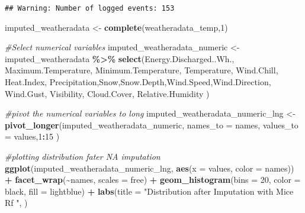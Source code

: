 \documentclass[
]{article}
\newenvironment{Shaded}{\begin{snugshade}}{\end{snugshade}}
\newcommand{\AttributeTok}[1]{\textcolor[rgb]{0.13,0.29,0.53}{#1}}
\newcommand{\CommentTok}[1]{\textcolor[rgb]{0.56,0.35,0.01}{\textit{#1}}}
\newcommand{\DecValTok}[1]{\textcolor[rgb]{0.00,0.00,0.81}{#1}}
\newcommand{\FunctionTok}[1]{\textcolor[rgb]{0.13,0.29,0.53}{\textbf{#1}}}
\newcommand{\NormalTok}[1]{#1}
\newcommand{\OtherTok}[1]{\textcolor[rgb]{0.56,0.35,0.01}{#1}}
\newcommand{\SpecialCharTok}[1]{\textcolor[rgb]{0.81,0.36,0.00}{\textbf{#1}}}
\newcommand{\StringTok}[1]{\textcolor[rgb]{0.31,0.60,0.02}{#1}}
\begin{document}
\begin{verbatim}
## Warning: Number of logged events: 153
\end{verbatim}

\begin{Shaded}
\begin{Highlighting}[]
\NormalTok{imputed\_weatheradata }\OtherTok{\textless{}{-}} \FunctionTok{complete}\NormalTok{(weatheradata\_temp,}\DecValTok{1}\NormalTok{)}

\CommentTok{\#Select numerical variables }
\NormalTok{imputed\_weatheradata\_numeric }\OtherTok{\textless{}{-}}\NormalTok{ imputed\_weatheradata }\SpecialCharTok{\%\textgreater{}\%}
  \FunctionTok{select}\NormalTok{(Energy.Discharged..Wh., Maximum.Temperature, }
\NormalTok{         Minimum.Temperature, Temperature, Wind.Chill, }
\NormalTok{          Heat.Index, Precipitation,Snow,Snow.Depth,Wind.Speed,Wind.Direction, }
\NormalTok{          Wind.Gust, Visibility, Cloud.Cover, Relative.Humidity ) }

\CommentTok{\#pivot the numerical variables to long }
\NormalTok{imputed\_weatheradata\_numeric\_lng }\OtherTok{\textless{}{-}} \FunctionTok{pivot\_longer}\NormalTok{(imputed\_weatheradata\_numeric, }
                                        \AttributeTok{names\_to =} \StringTok{\textquotesingle{}names\textquotesingle{}}\NormalTok{, }
                                        \AttributeTok{values\_to =} \StringTok{\textquotesingle{}values\textquotesingle{}}\NormalTok{,}\DecValTok{1}\SpecialCharTok{:}\DecValTok{15}\NormalTok{ )}

\CommentTok{\#plotting distribution fater NA imputation }
\FunctionTok{ggplot}\NormalTok{(imputed\_weatheradata\_numeric\_lng, }\FunctionTok{aes}\NormalTok{(}\AttributeTok{x =}\NormalTok{ values, }
                                    \AttributeTok{color =}\NormalTok{ names)) }\SpecialCharTok{+}
  \FunctionTok{facet\_wrap}\NormalTok{(}\SpecialCharTok{\textasciitilde{}}\NormalTok{names, }
             \AttributeTok{scales =} \StringTok{\textquotesingle{}free\textquotesingle{}}\NormalTok{) }\SpecialCharTok{+}
  \FunctionTok{geom\_histogram}\NormalTok{(}\AttributeTok{bins =} \DecValTok{20}\NormalTok{, }
                 \AttributeTok{color =} \StringTok{\textquotesingle{}black\textquotesingle{}}\NormalTok{, }
                 \AttributeTok{fill =} \StringTok{\textquotesingle{}lightblue\textquotesingle{}}\NormalTok{) }\SpecialCharTok{+}
    \FunctionTok{labs}\NormalTok{(}\AttributeTok{title =} \StringTok{"Distribution after Imputation with Mice Rf "}\NormalTok{,}
\NormalTok{ )}
\end{Highlighting}
\end{Shaded}
\end{document}
